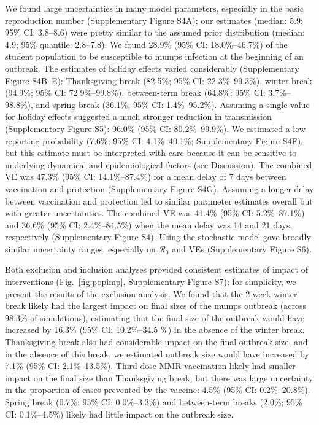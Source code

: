 \documentclass[12pt]{article}
\newcommand{\fref}[1]{Fig.~\ref{fig:#1}}
\begin{document}
We found large uncertainties in many model parameters, especially in the basic reproduction number (Supplementary Figure S4A); our estimates (median: 5.9; 95\% CI: 3.8--8.6) were pretty similar to the assumed prior distribution (median: 4.9; 95\% quantile: 2.8--7.8).
We found 28.9\% (95\% CI: 18.0\%--46.7\%) of the student population to be susceptible to mumps infection at the beginning of an outbreak.
The estimates of holiday effects varied considerably (Supplementary Figure S4B--E): Thanksgiving break (82.5\%; 95\% CI: 22.3\%--99.3\%), winter break (94.9\%; 95\% CI: 72.9\%--99.8\%), between-term break (64.8\%; 95\% CI: 3.7\%--98.8\%), and spring break (36.1\%; 95\% CI: 1.4\%--95.2\%). 
Assuming a single value for holiday effects suggested a much stronger reduction in transmission (Supplementary Figure S5): 96.0\% (95\% CI: 80.2\%--99.9\%).
We estimated a low reporting probability (7.6\%; 95\% CI: 4.1\%--40.1\%; Supplementary Figure S4F), but this estimate must be interpreted with care because it can be sensitive to underlying dynamical and epidemiological factors (see Discussion).
The combined VE was 47.3\% (95\% CI: 14.1\%--87.4\%) for a mean delay of 7 days between vaccination and protection (Supplementary Figure S4G). 
Assuming a longer delay between vaccination and protection led to similar parameter estimates overall but with greater uncertainties.
The combined VE was 41.4\% (95\% CI: 5.2\%--87.1\%) and 36.6\% (95\% CI: 2.4\%--84.5\%) when the mean delay was 14 and 21 days, respectively (Supplementary Figure S4).
Using the stochastic model gave broadly similar uncertainty ranges, especially on $\mathcal R_0$ and VEs (Supplementary Figure S6).

Both exclusion and inclusion analyses provided consistent estimates of impact of interventions (\fref{popimp}, Supplementary Figure S7); for simplicity, we present the results of the exclusion analysis.
We found that the 2-week winter break likely had the largest impact on final sizes of the mumps outbreak (across 98.3\% of simulations), estimating that the final size of the outbreak would have increased by 16.3\% (95\% CI: 10.2\%--34.5 \%) in the absence of the winter break.
Thanksgiving break also had considerable impact on the final outbreak size, and in the absence of this break, we estimated outbreak size would have increased by 7.1\% (95\% CI: 2.1\%--13.5\%).
Third dose MMR vaccination likely had smaller impact on the final size than Thanksgiving break, but there was large uncertainty in the proportion of cases prevented by the vaccine: 4.5\% (95\% CI: 0.2\%--20.8\%).
Spring break (0.7\%; 95\% CI: 0.0\%--3.3\%) and between-term breaks (2.0\%; 95\% CI: 0.1\%--4.5\%) likely had little impact on the outbreak size.
\end{document}
